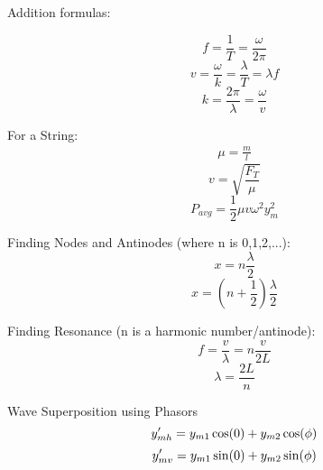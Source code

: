 \documentclass[11pt]{article}
\begin{document}
    \begin{minipage}[t]{0.5\textwidth}
    \noindent Addition formulas:

    \begin{equation}
        f = \frac{1}{T} = \frac{\omega}{2\pi} \tag{frequency}
    \end{equation}
    \begin{equation}
        v = \frac{\omega}{k} = \frac{\lambda}{T} = \lambda f \tag{wave velocity}
    \end{equation}
    \begin{equation}
        k = \frac{2\pi}{\lambda} = \frac{\omega}{v} \tag{angular wave number}
    \end{equation}
    \end{minipage}
    \begin{minipage}[t]{0.46\textwidth}
    \noindent For a String:
    \begin{align}
        \mu = \frac{m}{l} \tag{linear density}
    \end{align}
    \begin{equation}
        v = \sqrt {\frac{F_T}{\mu}} \tag{wave velocity}
    \end{equation}
    \begin{equation}
        P_{avg} = \frac{1}{2} \mu v \omega^2 y_m^2 \tag{average power}
    \end{equation}
    \end{minipage}

\noindent Finding Nodes and Antinodes (where n is 0,1,2,...):
    \begin{equation}
        x = n \frac{\lambda}{2} \tag{node position}
    \end{equation}
    \begin{equation}
        x = (n + \frac{1}{2})\frac{\lambda}{2} \tag{antinode position}
    \end{equation}

    \noindent Finding Resonance (n is a harmonic number/antinode):
    \begin{equation}
        f = \frac{v}{\lambda} = n \frac{v}{2L} \tag{Resonant frequency}
    \end{equation}
    \begin{equation}
        \lambda = \frac{2L}{n} \tag{wavelength \lambda}
    \end{equation}

    \noindent Wave Superposition using Phasors
    \begin{equation}
        y'_{mh} = y_{m1}\cos(0) + y_{m2}\cos(\phi) \notag
    \end{equation}
    \begin{equation}
        y'_{mv} = y_{m1}\sin(0) + y_{m2}\sin(\phi) \notag
    \end{equation}
\end{document}
